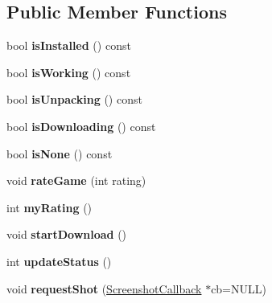\subsection*{Public Member Functions}
\begin{DoxyCompactItemize}
\item 
\hypertarget{struct_game_info_a2a709ceaa4edb84f1e3f08eeafe9d17e}{bool {\bfseries is\-Installed} () const }\label{struct_game_info_a2a709ceaa4edb84f1e3f08eeafe9d17e}

\item 
\hypertarget{struct_game_info_a0a71afc85ba8cf5e470fdc0825bc751e}{bool {\bfseries is\-Working} () const }\label{struct_game_info_a0a71afc85ba8cf5e470fdc0825bc751e}

\item 
\hypertarget{struct_game_info_a58a48b11381e016e88d580177eaa6139}{bool {\bfseries is\-Unpacking} () const }\label{struct_game_info_a58a48b11381e016e88d580177eaa6139}

\item 
\hypertarget{struct_game_info_a685c55a5e2fee6af7c800a460df6a8e8}{bool {\bfseries is\-Downloading} () const }\label{struct_game_info_a685c55a5e2fee6af7c800a460df6a8e8}

\item 
\hypertarget{struct_game_info_a8047e6a6df266b91fffcbcc359e06701}{bool {\bfseries is\-None} () const }\label{struct_game_info_a8047e6a6df266b91fffcbcc359e06701}

\item 
\hypertarget{struct_game_info_a57a16e880b689e6111a14e961b5bbcef}{void {\bfseries rate\-Game} (int rating)}\label{struct_game_info_a57a16e880b689e6111a14e961b5bbcef}

\item 
\hypertarget{struct_game_info_af0d17cc502f6302a341abeed1c9f53a4}{int {\bfseries my\-Rating} ()}\label{struct_game_info_af0d17cc502f6302a341abeed1c9f53a4}

\item 
\hypertarget{struct_game_info_a98db2c16d0342333c5a60d14d28eac38}{void {\bfseries start\-Download} ()}\label{struct_game_info_a98db2c16d0342333c5a60d14d28eac38}

\item 
\hypertarget{struct_game_info_acfbacf7a61b452f9f371d93dbb48c5d1}{int {\bfseries update\-Status} ()}\label{struct_game_info_acfbacf7a61b452f9f371d93dbb48c5d1}

\item 
\hypertarget{struct_game_info_aef1cf58d4fa76510fbb628a91b7cb086}{void {\bfseries request\-Shot} (\hyperlink{struct_screenshot_callback}{Screenshot\-Callback} $\ast$cb=N\-U\-L\-L)}\label{struct_game_info_aef1cf58d4fa76510fbb628a91b7cb086}


\end{DoxyCompactItemize}

